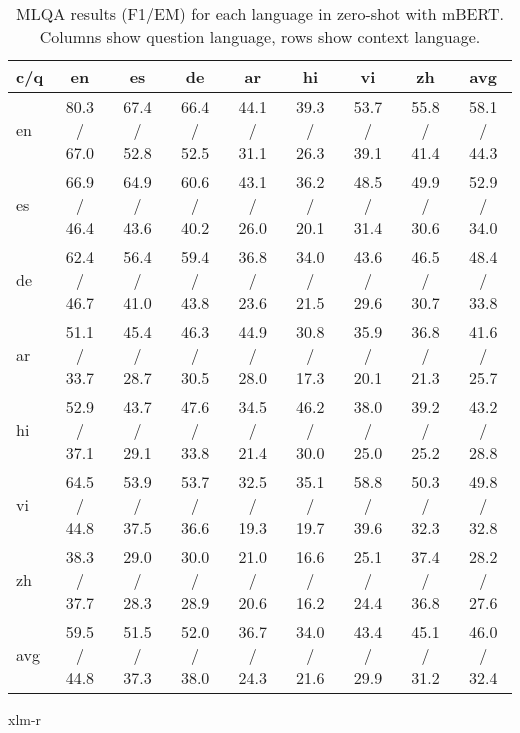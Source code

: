 \documentclass[11pt]{article}
\begin{document}
\begin{table*}[!ht]
    \centering
    \begin{adjustbox}{max width=\textwidth}
    \begin{tabular}{l|ccccccc|c}
    \toprule
        c/q & en & es & de & ar & hi & vi & zh & avg \\ \midrule
        en & 80.3 / 67.0 & 67.4 / 52.8 & 66.4 / 52.5 & 44.1 / 31.1 & 39.3 / 26.3 & 53.7 / 39.1 & 55.8 / 41.4 & 58.1 / 44.3 \\
        es & 66.9 / 46.4 & 64.9 / 43.6 & 60.6 / 40.2 & 43.1 / 26.0 & 36.2 / 20.1 & 48.5 / 31.4 & 49.9 / 30.6 & 52.9 / 34.0 \\ 
        de & 62.4 / 46.7 & 56.4 / 41.0 & 59.4 / 43.8 & 36.8 / 23.6 & 34.0 / 21.5 & 43.6 / 29.6 & 46.5 / 30.7 & 48.4 / 33.8 \\ 
        ar & 51.1 / 33.7 & 45.4 / 28.7 & 46.3 / 30.5 & 44.9 / 28.0 & 30.8 / 17.3 & 35.9 / 20.1 & 36.8 / 21.3 & 41.6 / 25.7 \\ 
        hi & 52.9 / 37.1 & 43.7 / 29.1 & 47.6 / 33.8 & 34.5 / 21.4 & 46.2 / 30.0 & 38.0 / 25.0 & 39.2 / 25.2 & 43.2 / 28.8 \\ 
        vi & 64.5 / 44.8 & 53.9 / 37.5 & 53.7 / 36.6 & 32.5 / 19.3 & 35.1 / 19.7 & 58.8 / 39.6 & 50.3 / 32.3 & 49.8 / 32.8 \\ 
        zh & 38.3 / 37.7 & 29.0 / 28.3 & 30.0 / 28.9 & 21.0 / 20.6 & 16.6 / 16.2 & 25.1 / 24.4 & 37.4 / 36.8 & 28.2 / 27.6 \\ \midrule
        avg & 59.5 / 44.8 & 51.5 / 37.3 & 52.0 / 38.0 & 36.7 / 24.3 & 34.0 / 21.6 & 43.4 / 29.9 & 45.1 / 31.2 & 46.0 / 32.4 \\ \bottomrule
    \end{tabular}
    \end{adjustbox}
    \caption{MLQA results (F1/EM) for each language in zero-shot with mBERT. Columns show question language, rows show context language.}
    \label{MLQA_results_ZS_mBERT}
\end{table*}



xlm-r
\end{document}

